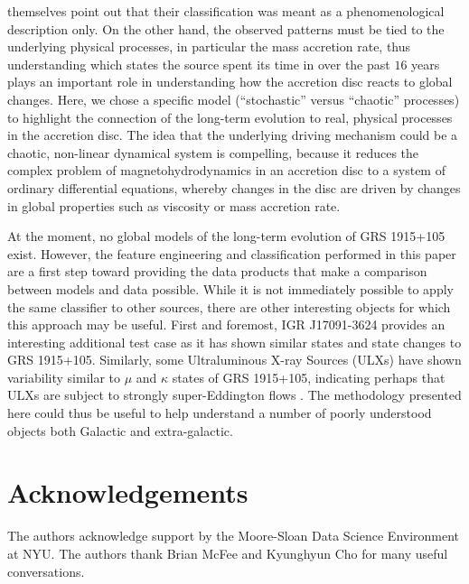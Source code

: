 \documentclass[fleqn,usenatbib]{mnras}
\begin{document}
\citet{belloni2000} themselves point out that their classification was meant as a phenomenological description only. On the other hand, the observed patterns 
must be tied to the underlying physical processes, in particular the mass accretion rate, thus understanding which states the source spent its time in over the 
past $16$ years plays an important role in understanding how the accretion disc reacts to global changes. Here, we chose a specific model (``stochastic'' versus 
``chaotic'' processes) to highlight the connection of the long-term evolution to real, physical processes in the accretion disc. The idea that the underlying driving 
mechanism could be a chaotic, non-linear dynamical system is compelling, because it reduces the complex problem of magnetohydrodynamics in an 
accretion disc to a system of ordinary differential equations, whereby changes in the disc are driven by changes in global properties such as viscosity or mass 
accretion rate. 

At the moment, no global models of the long-term evolution of GRS 1915+105 exist. However, the feature engineering and classification performed 
in this paper are a first step toward providing the data products that make a comparison between models and data possible. While it is not immediately possible to 
apply the same classifier to other sources, there are other interesting objects for which this approach may be useful. First and foremost, IGR J17091-3624 provides an 
interesting additional test case as it has shown similar states and state changes to GRS 1915+105. Similarly, some Ultraluminous X-ray Sources (ULXs) have shown variability 
similar to $\mu$ and $\kappa$ states of GRS 1915+105, indicating perhaps that ULXs are subject to strongly super-Eddington flows \citep{middleton2011}. 
The methodology presented here could thus be useful to help understand a number of poorly understood objects both Galactic and extra-galactic. 

\section*{Acknowledgements}

The authors acknowledge support by the Moore-Sloan Data Science Environment at NYU. The authors thank Brian McFee and Kyunghyun Cho for many useful conversations.









\bsp	%
\label{lastpage}
\end{document}
